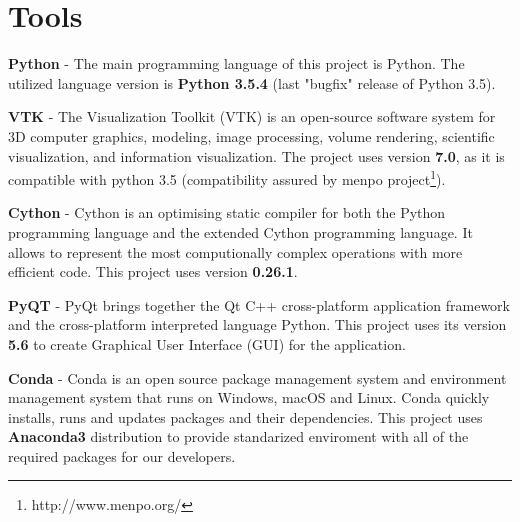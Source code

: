 \section{Tools}

\textbf{Python} - The main programming language of this project is Python. The utilized language version is \textbf{Python 3.5.4} (last "bugfix" release of Python 3.5).

\textbf{VTK} - The Visualization Toolkit (VTK) is an open-source software system for 3D computer graphics, modeling, image processing, volume rendering, scientific visualization, and information visualization.
The project uses version \textbf{7.0}, as it is compatible with python 3.5 (compatibility assured by menpo project\footnote{http://www.menpo.org/}).

\textbf{Cython} - Cython is an optimising static compiler for both the Python programming language and the extended Cython programming language. It allows to represent the most computionally complex operations with more efficient code. This project uses version \textbf{0.26.1}.

\textbf{PyQT} - PyQt brings together the Qt C++ cross-platform application framework and the cross-platform interpreted language Python. This project uses its version \textbf{5.6} to create Graphical User Interface (GUI) for the application.

\textbf{Conda} - Conda is an open source package management system and environment management system that runs on Windows, macOS and Linux. Conda quickly installs, runs and updates packages and their dependencies. This project uses \textbf{Anaconda3} distribution to provide standarized enviroment with all of the required packages for our developers.